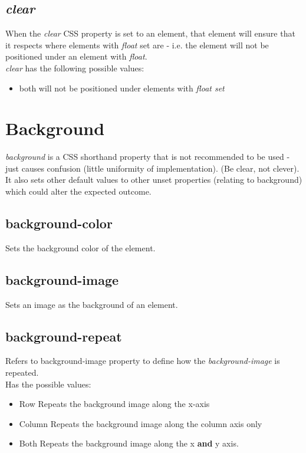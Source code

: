 \documentclass[]{article}
\newcommand{\<}{\guilsinglleft}
\renewcommand{\>}{\guilsinglright}
\renewcommand{\it}[1]{\textit{#1}}
\renewcommand{\bf}[1]{\textbf{#1}}
\begin{document}
\subsection{\it{clear}}
When the \it{clear} CSS property is set to an element, that element will ensure that it respects where elements with \it{float} set are - i.e. the element will not be positioned under an element with \it{float}.  
\\
\it{clear} has the following possible values:
\begin{itemize}
	\item both 
	\subitem will not be positioned under elements with \it{float set}
\end{itemize}

\section{Background}
\it{background} is a CSS shorthand property that is not recommended to be used - just causes confusion (little uniformity of implementation). (Be clear, not clever).
\\
It also sets other default values to other unset properties (relating to background) which could alter the expected outcome.

\subsection{background-color}
Sets the background color of the element.

\subsection{background-image}
Sets an image as the background of an element.

\subsection{background-repeat}
Refers to background-image property to define how the \it{background-image} is repeated.
\\
Has the possible values:
\begin{itemize}
	\item Row 
	\subitem Repeats the background image along the x-axis
	
	\item Column
	\subitem Repeats the background image along the column axis only
	
	\item Both
	\subitem Repeats the background image along the x \bf{and} y axis.
\end{itemize}
\end{document}
